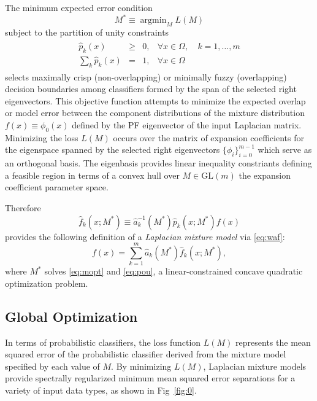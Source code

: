 \documentclass[10pt,letterpaper]{article}
\DeclareMathOperator*{\argmin}{argmin}
\begin{document}
The minimum expected error condition
\begin{equation}
M^{*} \equiv \argmin_{M}L(M) \label{eq:mopt}
\end{equation}
subject to the partition of unity constraints
\begin{align}
\begin{array}{ccccc}
\hat p_k(x) &\geqslant& 0,&\forall x \in \Omega,&\ k = 1, \dots, m\\
\displaystyle \sum_k \hat p_k(x) &=& 1,&\forall x \in \Omega&
\end{array} \label{eq:pou}
\end{align}
selects maximally crisp (non-overlapping) or minimally fuzzy (overlapping) decision boundaries among classifiers formed by the span of the selected right eigenvectors.
This objective function attempts to minimize the expected overlap or model error between the component distributions of the mixture distribution $f(x) \equiv \phi_0(x)$ defined by the PF eigenvector of the input Laplacian matrix.
Minimizing the loss $L(M)$ occurs over the matrix of expansion coefficients for the eigenspace spanned by the selected right eigenvectors $\{\phi_i\}_{i = 0}^{m - 1}$ which serve as an orthogonal basis.
The eigenbasis provides linear inequality constriants defining a feasible region in terms of a convex hull over $M \in \mathrm{GL}(m)$ the expansion coefficient parameter space.

Therefore
\begin{equation}
\hat f_k(x; M^{*}) \equiv \hat a_k^{-1}(M^{*}) \hat p_k(x; M^{*}) f(x) \label{eq:fw}
\end{equation}
provides the following definition of a \emph{Laplacian mixture model} via \eqref{eq:waf}:
\begin{equation}
f(x) = \sum_{k = 1}^m \hat a_k(M^{*}) \hat f_k(x; M^{*}),\label{eq:mmm}
\end{equation}
where $M^{*}$ solves \eqref{eq:mopt} and \eqref{eq:pou}, a linear-constrained concave quadratic optimization problem.
\subsection{Global Optimization}\label{sec:gopt}
In terms of probabilistic classifiers, the loss function $L(M)$ represents the mean squared error of the probabilistic classifier derived from the mixture model specified by each value of $M$.
By minimizing $L(M)$, Laplacian mixture models provide spectrally regularized minimum mean squared error separations for a variety of input data types, as shown in Fig~\ref{fig:0}.
\end{document}
